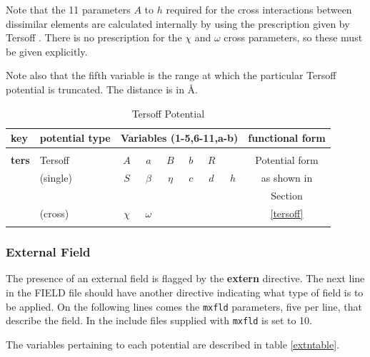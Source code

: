 Note that the 11 parameters $A$ to $h$ required for the cross
interactions between dissimilar elements are calculated internally by
\D{} using the prescription given by Tersoff \cite{tersoff-89a}. There
is no prescription for the  $\chi$ and $\omega$ cross parameters, so
these must be given explicitly.

Note also that the fifth variable is the range at which the particular
Tersoff potential is truncated.  The
distance is in \AA.

\begin{table}[htbp]
\begin{centering}
\caption{\label{terstable} Tersoff Potential}
\vskip 5pt
\begin{tabular}{|l|l|c|c|c|c|c|c|c|}
\hline
key & potential type & \multicolumn{6}{c|}{Variables (1-5,6-11,a-b)} & functional form \\
\hline
           &          &        &          &        &     &     &     & \\
{\bf ters} & Tersoff  & $A$    & $a$      & $B$    & $b$ & $R$ &     &
Potential form \\
           & (single) & $S$    & $\beta$  & $\eta$ & $c$ & $d$ & $h$ &
as shown in \\
           &          &        &          &        &     &     &     &
Section \\
           & (cross)  & $\chi$ & $\omega$ &        &     &     &     &
\ref{tersoff} \\
           &          &        &          &        &     &     &     & \\
\hline
\end{tabular}
\end{centering}
\vskip 5mm
\end{table}


\subsubsection{External Field}
The presence of an external field is flagged by the {\bf extern} directive.
The next line in the FIELD file should have another directive indicating
what type of field is to be applied. On the following lines comes the
{\tt mxfld} parameters, five per line, that describe the field. In the
include files supplied with \D{} {\tt mxfld} is set to 10. 

\noindent The variables pertaining to each potential are described in table
\ref{extntable}. 

